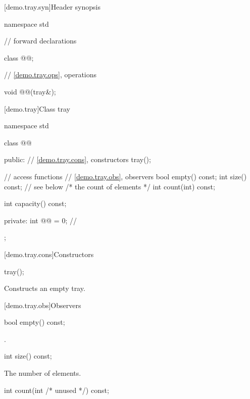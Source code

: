 [demo.tray.syn]{Header synopsis}

\begin{codeblock}
namespace std {
  // forward declarations

  class @@;

  // \ref{demo.tray.ops}, operations

  void @@(tray&);
}
\end{codeblock}

[demo.tray]{Class tray}

\begin{codeblock}
namespace std {
  class @@ {
  public:
    // \ref{demo.tray.cons}, constructors
    tray();

    // access functions
    // \ref{demo.tray.obs}, observers
    bool empty() const;
    int size() const; // see below
    /* the count of elements */
    int count(int) const;

    int capacity() const;

  private:
    int @@ = 0; // \expos
  };
}
\end{codeblock}

[demo.tray.cons]{Constructors}

%
\begin{itemdecl}
tray();
\end{itemdecl}

\begin{itemdescr}
\pnum
\effects
Constructs an empty tray.
\end{itemdescr}

[demo.tray.obs]{Observers}

%
\begin{itemdecl}
bool empty() const;
\end{itemdecl}

\begin{itemdescr}
\pnum
\returns
{}.
\end{itemdescr}

%
\begin{itemdecl}
int size() const;
\end{itemdecl}

\begin{itemdescr}
\pnum
\returns
The number of elements.
\end{itemdescr}

%
\begin{itemdecl}
int count(int /* unused */) const;
\end{itemdecl}

